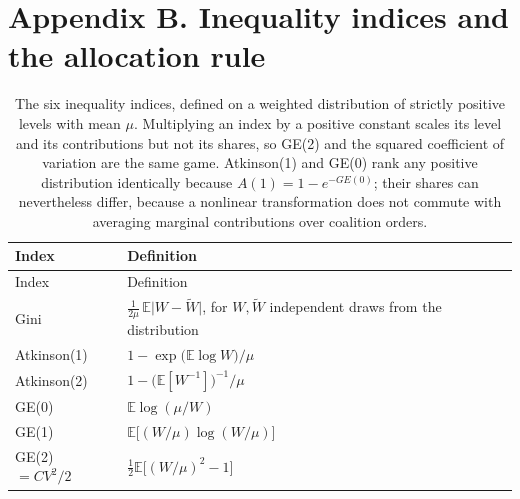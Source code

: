 \section{Appendix B. Inequality indices and the allocation rule}\label{appendix-b.-inequality-indices-and-the-allocation-rule}

\small\setlength{\tabcolsep}{3pt}\begin{longtable}[]{@{}
  >{\raggedright\arraybackslash}p{}
  >{\raggedright\arraybackslash}p{}@{}}
\caption{The six inequality indices, defined on a weighted distribution of strictly positive levels with mean \(\mu\). Multiplying an index by a positive constant scales its level and its contributions but not its shares, so GE(2) and the squared coefficient of variation are the same game. Atkinson(1) and GE(0) rank any positive distribution identically because \(A(1)=1-e^{-GE(0)}\); their shares can nevertheless differ, because a nonlinear transformation does not commute with averaging marginal contributions over coalition orders.}\tabularnewline
\toprule\noalign{}
\begin{minipage}[b]{\linewidth}\raggedright
Index
\end{minipage} & \begin{minipage}[b]{\linewidth}\raggedright
Definition
\end{minipage} \\
\midrule\noalign{}
\endfirsthead
\toprule\noalign{}
\begin{minipage}[b]{\linewidth}\raggedright
Index
\end{minipage} & \begin{minipage}[b]{\linewidth}\raggedright
Definition
\end{minipage} \\
\midrule\noalign{}
\endhead
\bottomrule\noalign{}
\endlastfoot
Gini & \(\frac{1}{2\mu}\,\mathbb{E}\lvert W-\tilde W\rvert\), for \(W,\tilde W\) independent draws from the distribution \\
Atkinson(1) & \(1-\exp\!\big(\mathbb{E}\log W\big)/\mu\) \\
Atkinson(2) & \(1-\big(\mathbb{E}[W^{-1}]\big)^{-1}/\mu\) \\
GE(0) & \(\mathbb{E}\log(\mu/W)\) \\
GE(1) & \(\mathbb{E}\big[(W/\mu)\log(W/\mu)\big]\) \\
GE(2) \(=CV^2/2\) & \(\tfrac{1}{2}\mathbb{E}\big[(W/\mu)^2-1\big]\) \\
\end{longtable}

